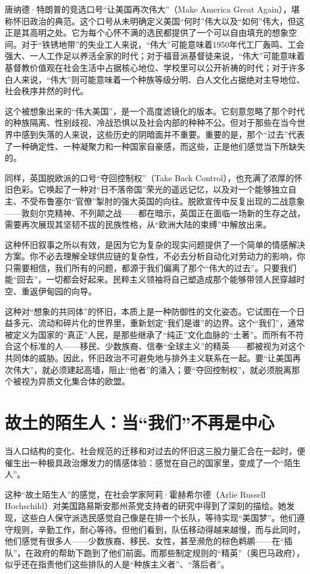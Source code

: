 唐纳德·特朗普的竞选口号“让美国再次伟大”（Make America Great Again），堪称怀旧政治的典范。这个口号从未明确定义美国“何时”伟大以及“如何”伟大，但这正是其高明之处。它为每个心怀不满的选民都提供了一个可以自由填充的想象空间。对于“铁锈地带”的失业工人来说，“伟大”可能意味着1950年代工厂轰鸣、工会强大、一人工作足以养活全家的时代；对于福音派基督徒来说，“伟大”可能意味着基督教价值观在社会生活中占据核心地位、学校里可以公开祈祷的时代；对于许多白人来说，“伟大”则可能意味着一个种族等级分明、白人文化占据绝对主导地位、社会秩序井然的时代。

这个被想象出来的“伟大美国”，是一个高度滤镜化的版本。它刻意忽略了那个时代的种族隔离、性别歧视、冷战恐惧以及社会内部的种种不公。但对于那些在当今世界中感到失落的人来说，这些历史的阴暗面并不重要。重要的是，那个“过去”代表了一种确定性、一种凝聚力和一种国家自豪感，而这些，正是他们感觉当下所缺失的。

同样，英国脱欧派的口号“夺回控制权”（Take Back Control），也充满了浓厚的怀旧色彩。它唤起了一种对“日不落帝国”荣光的遥远记忆，以及对一个能够独立自主、不受布鲁塞尔“官僚”掣肘的强大英国的向往。脱欧宣传中反复出现的二战意象——敦刻尔克精神、不列颠之战——都在暗示，英国正在面临一场新的生存之战，需要再次展现其坚韧不拔的民族性格，从“欧洲大陆的束缚”中解放出来。

这种怀旧叙事之所以有效，是因为它为复杂的现实问题提供了一个简单的情感解决方案。你不必去理解全球供应链的复杂性，不必去分析自动化对劳动力的影响，你只需要相信，我们所有的问题，都源于我们偏离了那个“伟大的过去”。只要我们能“回去”，一切都会好起来。民粹主义领袖将自己塑造成那个能够带领人民穿越时空、重返伊甸园的向导。

这种对“想象的共同体”的怀旧，本质上是一种防御性的文化姿态。它试图在一个日益多元、流动和碎片化的世界里，重新划定“我们是谁”的边界。这个“我们”，通常被定义为国家的“真正”人民，是那些继承了“纯正”文化血脉的“土著”。而所有不符合这个标准的人——移民、少数族裔、信奉“全球主义”的精英——都被视为对这个共同体的威胁。因此，怀旧政治不可避免地与排外主义联系在一起。要“让美国再次伟大”，就必须建起高墙，阻止“他者”的涌入；要“夺回控制权”，就必须脱离那个被视为异质文化集合体的欧盟。

\section{故土的陌生人：当“我们”不再是中心}

当人口结构的变化、社会规范的迁移和对过去的怀旧这三股力量汇合在一起时，便催生出一种极具政治爆发力的情感体验：感觉在自己的国家里，变成了一个“陌生人”。

这种“故土陌生人”的感觉，在社会学家阿莉·霍赫希尔德（Arlie Russell Hochschild）对美国路易斯安那州茶党支持者的研究中得到了深刻的描绘。她发现，这些白人保守派选民感觉自己像是在排一个长队，等待实现“美国梦”。他们遵守规则，辛勤工作，耐心等待。但他们看到，队伍移动得越来越慢，而与此同时，他们感觉有很多人——少数族裔、移民、女性，甚至濒危的棕色鹈鹕——在“插队”，在政府的帮助下跑到了他们前面。而那些制定规则的“精英”（奥巴马政府），似乎还在指责他们这些排队的人是“种族主义者”、“落后者”。

